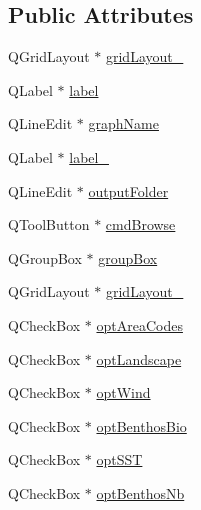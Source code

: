 \subsection*{Public Attributes}
\begin{DoxyCompactItemize}
\item 
Q\+Grid\+Layout $\ast$ \mbox{\hyperlink{class_ui___save_graph_dialog_a2700587da0136efa2e4c715c2c057422}{grid\+Layout\+\_}}
\item 
Q\+Label $\ast$ \mbox{\hyperlink{class_ui___save_graph_dialog_a58037d91ae42925d3a77410e0b9d9804}{label}}
\item 
Q\+Line\+Edit $\ast$ \mbox{\hyperlink{class_ui___save_graph_dialog_a668816cb28da801db03e7d7c1e37b73a}{graph\+Name}}
\item 
Q\+Label $\ast$ \mbox{\hyperlink{class_ui___save_graph_dialog_ad2348fc628d4eee57499d45232538312}{label\+\_}}
\item 
Q\+Line\+Edit $\ast$ \mbox{\hyperlink{class_ui___save_graph_dialog_a8d11854066de10d3ea4a224fa46e9e01}{output\+Folder}}
\item 
Q\+Tool\+Button $\ast$ \mbox{\hyperlink{class_ui___save_graph_dialog_a723347a6455d69f9b531576eec3a567f}{cmd\+Browse}}
\item 
Q\+Group\+Box $\ast$ \mbox{\hyperlink{class_ui___save_graph_dialog_ade620329d9d836f22c2b9fcf5d1a37d3}{group\+Box}}
\item 
Q\+Grid\+Layout $\ast$ \mbox{\hyperlink{class_ui___save_graph_dialog_a04a104f713955a61af09bf8e24d343c2}{grid\+Layout\+\_}}
\item 
Q\+Check\+Box $\ast$ \mbox{\hyperlink{class_ui___save_graph_dialog_a327a41f606da2a21f4cdaf9238d5c4df}{opt\+Area\+Codes}}
\item 
Q\+Check\+Box $\ast$ \mbox{\hyperlink{class_ui___save_graph_dialog_addc6ff29093b53537b0ad978ccc4e27c}{opt\+Landscape}}
\item 
Q\+Check\+Box $\ast$ \mbox{\hyperlink{class_ui___save_graph_dialog_a8d1793b5c45a73d0bd4b75b7dcca7448}{opt\+Wind}}
\item 
Q\+Check\+Box $\ast$ \mbox{\hyperlink{class_ui___save_graph_dialog_a5981b96305db59294c04d44a5beb3caa}{opt\+Benthos\+Bio}}
\item 
Q\+Check\+Box $\ast$ \mbox{\hyperlink{class_ui___save_graph_dialog_a32b0d4dcf7088d474aa6552819f13f50}{opt\+S\+ST}}
\item 
Q\+Check\+Box $\ast$ \mbox{\hyperlink{class_ui___save_graph_dialog_aaac123b995fd9eb653688168cdb59700}{opt\+Benthos\+Nb}}
\item 

\end{DoxyCompactItemize}
